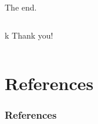 \documentclass{beamer}
\begin{document}
\begin{frame}{The end.}
\begin{columns}
k
Thank you!
    
\end{columns}    
    
    
\end{frame}

\section{References}
\begin{frame}[allowframebreaks]\frametitle{References}
        
        
\end{frame}
\end{document}
